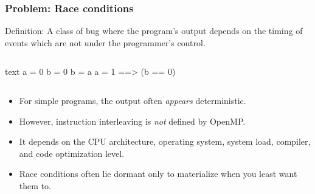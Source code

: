 \documentclass[handout]{beamer}
\begin{document}
\begin{frame}[fragile]
  \frametitle{Problem: Race conditions}
  Definition: A class of bug where the program's output depends on the timing of events which are not under the programmer's control.  
  \begin{columns}[t]%
    \begin{column}{0.5\textwidth}
      \begin{ccode}[]
        {text}
        a = 0
        b = 0
        b = a
        a = 1
          ==> (b == 0)\end{ccode}
    \end{column}
  \end{columns}
  \pause
  \begin{itemize}
  \item For simple programs, the output often \emph{appears} deterministic.
  \item However, instruction interleaving is \emph{not} defined by OpenMP.
  \item It depends on the CPU architecture, operating system, system load, compiler, and code optimization level.
  \item Race conditions often lie dormant only to materialize when you least want them to.
  \end{itemize}

\end{frame}
\end{document}
